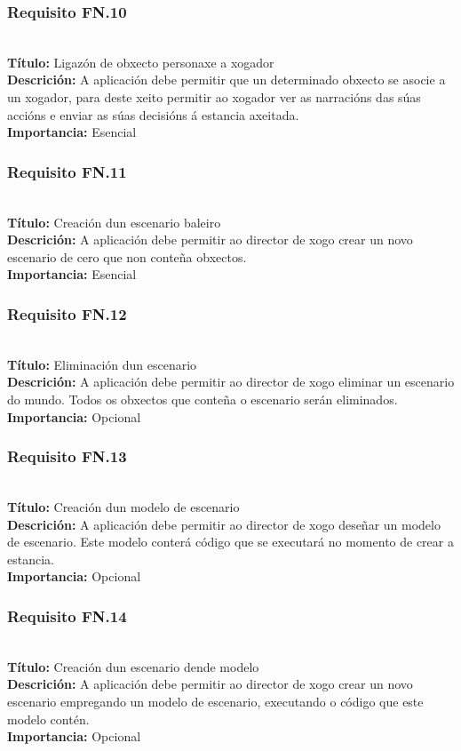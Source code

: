 \subsubsection{Requisito FN.10}~\\
{\bf Título:} Ligazón de obxecto personaxe a xogador\\
{\bf Descrición:} A aplicación debe permitir que un determinado obxecto se
asocie a un xogador, para deste xeito permitir ao xogador ver as narracións das
súas accións e enviar as súas decisións á estancia axeitada.\\
{\bf Importancia:} Esencial

\subsubsection{Requisito FN.11}~\\
{\bf Título:} Creación dun escenario baleiro\\
{\bf Descrición:} A aplicación debe permitir ao director de xogo crear un novo
escenario de cero que non conteña obxectos.\\
{\bf Importancia:} Esencial

\subsubsection{Requisito FN.12}~\\
{\bf Título:} Eliminación dun escenario\\
{\bf Descrición:} A aplicación debe permitir ao director de xogo eliminar un
escenario do mundo. Todos os obxectos que conteña o escenario serán eliminados.\\
{\bf Importancia:} Opcional

\subsubsection{Requisito FN.13}~\\
{\bf Título:} Creación dun modelo de escenario\\
{\bf Descrición:} A aplicación debe permitir ao director de xogo deseñar un
modelo de escenario. Este modelo conterá código que se executará no momento de
crear a estancia.\\
{\bf Importancia:} Opcional

\subsubsection{Requisito FN.14}~\\
{\bf Título:} Creación dun escenario dende modelo \\
{\bf Descrición:} A aplicación debe permitir ao director de xogo crear un novo
escenario empregando un modelo de escenario, executando o código que este modelo contén.\\
{\bf Importancia:} Opcional

